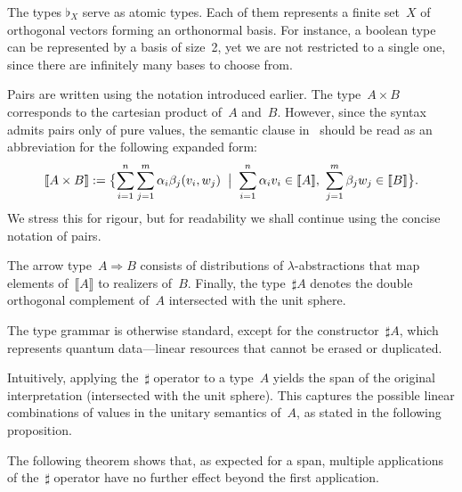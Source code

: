 \documentclass[runningheads,orivec,envcountsame,envcountsect]{llncs}
\providecommand{\qed}{\hbox{\rule{1ex}{1ex}}}%
\newcommand\Span[1]{\ensuremath{{\mathsf{Span}}{#1}}}
\def\Sph{\mathcal{S}_1}       %
\def\Arr{\Rightarrow}
\def\sem#1{\llbracket#1\rrbracket}
\newcommand\basis[1]{\ensuremath{\flat_{#1}}}
\begin{document}
The types $\basis{X}$ serve as atomic types. Each of them represents a finite
set~$X$ of orthogonal vectors forming an orthonormal basis. For instance, a
boolean type can be represented by a basis of size~2, yet we are not restricted
to a single one, since there are infinitely many bases to choose from.

Pairs are written using the notation introduced earlier.  The type~$A\times B$
corresponds to the cartesian product of~$A$ and~$B$.  However, since the syntax
admits pairs only of pure values, the semantic clause
in~ should be
read as an abbreviation for the following expanded form:
\[
  \sem{A\times B}
  := \bigl\{
       \sum_{i=1}^{n}\sum_{j=1}^{m}\alpha_i\beta_j(v_i,w_j)
       \;\bigm|\;
       \sum_{i=1}^{n}\alpha_i v_i\in\sem{A},~
       \sum_{j=1}^{m}\beta_j w_j\in\sem{B}
     \bigr\}.
\]
We stress this for rigour, but for readability we shall continue using the
concise notation of pairs.

The arrow type~$A\Arr B$ consists of distributions of $\lambda$-abstractions
that map elements of~$\sem{A}$ to realizers of~$B$.  
Finally, the type~$\sharp A$ denotes the double orthogonal complement of~$A$
intersected with the unit sphere.

The type grammar is otherwise standard, except for the constructor~$\sharp A$,
which represents quantum data---linear resources that cannot be erased or
duplicated.  

Intuitively, applying the~$\sharp$ operator to a type~$A$ yields the span of the
original interpretation (intersected with the unit sphere).  This captures the
possible linear combinations of values in the unitary semantics of~$A$, as
stated in the following proposition.




The following theorem shows that, as expected for a span, multiple
applications of the~$\sharp$ operator have no further effect beyond the first
application.

\end{document}
